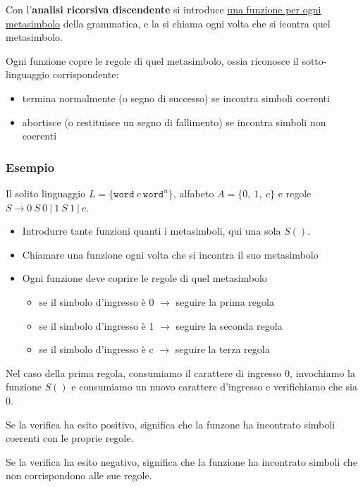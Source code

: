Con l'\textbf{analisi ricorsiva discendente} si introduce \underline{una funzione per ogni metasimbolo} della grammatica, e la si chiama ogni volta che si icontra quel metasimbolo.

Ogni funzione copre le regole di quel metasimbolo, ossia riconosce il sotto-linguaggio corrispondente:
\begin{itemize}
    \item termina normalmente (o segno di successo) se incontra simboli coerenti
    \item abortisce (o restituisce un segno di fallimento) se incontra simboli non coerenti
\end{itemize}

\subsubsection{Esempio}

Il solito linguaggio $L = \{\texttt{word}\ c\ \texttt{word}^n\}$, alfabeto $A = \{0,\ 1,\ c\}$ e regole $S \rightarrow 0\ S\ 0\ |\ 1\ S\ 1\ |\ c$. 

\begin{itemize}
    \item Introdurre tante funzioni quanti i metasimboli, qui una sola $S()$.
    \item Chiamare una funzione ogni volta che si incontra il suo metasimbolo
    \item Ogni funzione deve coprire le regole di quel metasimbolo
        \begin{itemize}
            \item se il simbolo d'ingresso è 0 $\rightarrow$ seguire la prima regola
            \item se il simbolo d'ingresso è 1 $\rightarrow$ seguire la seconda regola
            \item se il simbolo d'ingresso è c $\rightarrow$ seguire la terza regola
        \end{itemize}
\end{itemize}

Nel caso della prima regola, consumiamo il carattere di ingresso 0, invochiamo la funzione $S()$ e consumiamo un nuovo carattere d'ingresso e verifichiamo che sia 0.

Se la verifica ha esito positivo, significa che la funzone ha incontrato simboli coerenti con le proprie regole.

Se la verifica ha esito negativo, significa che la funzione ha incontrato simboli che non corrispondono alle sue regole.


